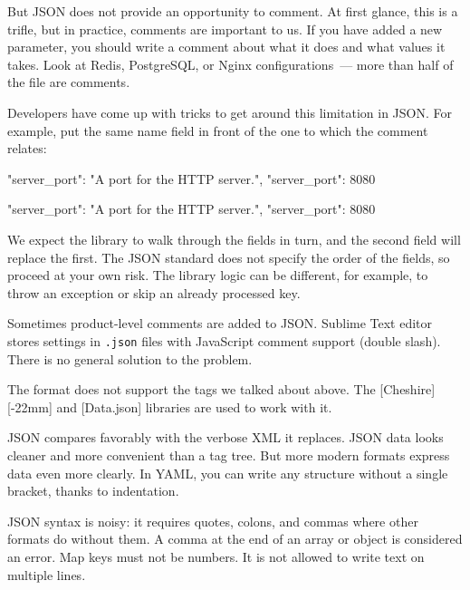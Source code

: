 But JSON does not provide an opportunity to comment. At first glance, this is a trifle, but in practice, comments are important to us. If you have added a new parameter, you should write a comment about what it does and what values it takes. Look at Redis, PostgreSQL, or Nginx configurations~--- more than half of the file are comments.

Developers have come up with tricks to get around this limitation in JSON.  For example, put the same name field in front of the one to which the comment relates:

\ifnarrow

\begin{json}
{
    "server_port":
    "A port for the HTTP server.",
    "server_port": 8080
}
\end{json}

\else

\begin{json}
{
    "server_port": "A port for the HTTP server.",
    "server_port": 8080
}
\end{json}

\fi

We expect the library to walk through the fields in turn, and the second field will replace the first. The JSON standard does not specify the order of the fields, so proceed at your own risk. The library logic can be different, for example, to throw an exception or skip an already processed key.

Sometimes product-level comments are added to JSON. Sublime Text editor stores settings in \verb|.json| files with JavaScript comment support (double slash). There is no general solution to the problem.


The format does not support the tags we talked about above. The [Cheshire][-22mm] and [Data.json] libraries are used to work with it.

JSON compares favorably with the verbose XML it replaces. JSON data looks cleaner and more convenient than a tag tree.  But more modern formats express data even more clearly. In YAML, you can write any structure without a single bracket, thanks to indentation.

JSON syntax is noisy: it requires quotes, colons, and commas where other formats do without them. A comma at the end of an array or object is considered an error. Map keys must not be numbers. It is not allowed to write text on multiple lines.

